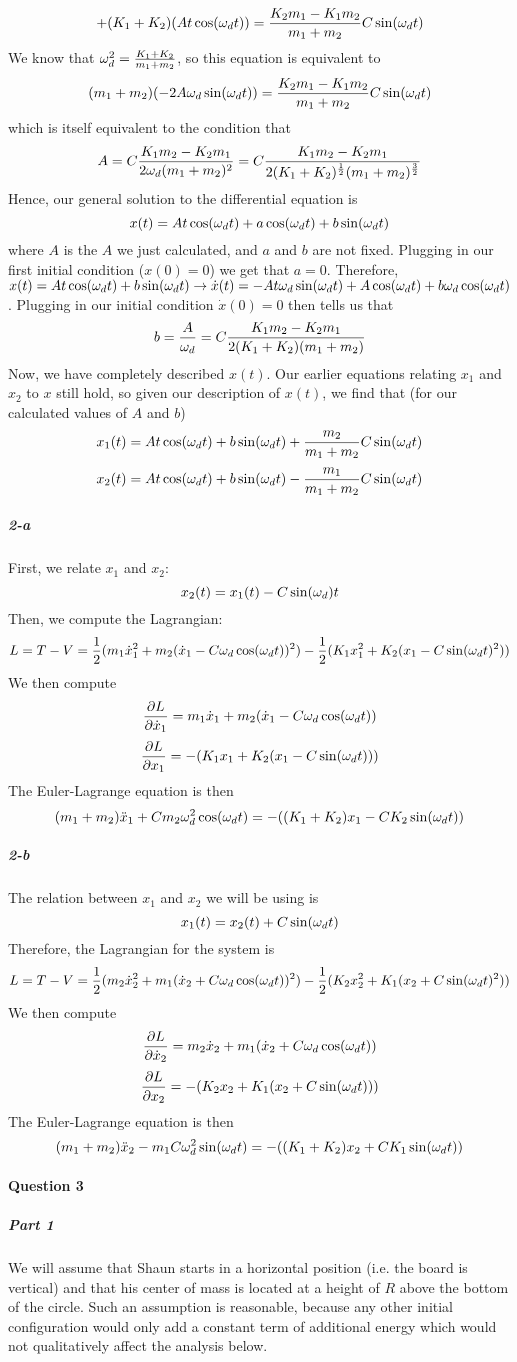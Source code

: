 $$+(K_1+K_2)( A t \cos(\omega_d t))=\frac{K_2 m_1-K_1 m_2}{m_1+m_2} C \sin(\omega_d t)$$
We know that $\omega_d^2 = \frac{K_1+K_2}{m_1+m_2}$, so this equation is equivalent to
$$(m_1+m_2)(-2A\omega_d \sin(\omega_d t))=\frac{K_2 m_1-K_1 m_2}{m_1+m_2} C \sin(\omega_d t)$$
which is itself equivalent to the condition that
$$A=C\frac{K_1 m_2-K_2 m_1}{2\omega_d(m_1+m_2)^2}=C\frac{K_1 m_2-K_2 m_1}{2(K_1+K_2)^{\frac 1 2}(m_1+m_2)^{\frac 3 2}}$$
Hence, our general solution to the differential equation is
$$x(t)=A t\cos(\omega_d t)+a \cos(\omega_d t)+b\sin(\omega_d t)$$
where $A$ is the $A$ we just calculated, and $a$ and $b$ are not fixed.  Plugging in our first initial condition ($x(0)=0$) we get that $a=0$.  Therefore, $x(t)=At\cos(\omega_d t)+b\sin(\omega_d t)\rightarrow \dot x(t)=-At \omega_d \sin(\omega_d t)+ A\cos(\omega_d t)+b\omega_d\cos(\omega_d t)$.  Plugging in our initial condition $\dot x(0)=0$ then tells us that
$$b=\frac{A}{\omega_d}=C\frac{K_1 m_2-K_2 m_1}{2(K_1+K_2)(m_1+m_2)}$$
Now, we have completely described $x(t)$.  Our earlier equations relating $x_1$ and $x_2$ to $x$ still hold, so given our description of $x(t)$, we find that (for our calculated values of $A$ and $b$)
$$x_1(t)=At \cos(\omega_d t)+b\sin(\omega_d t)+\frac{m_2}{m_1+m_2} C\sin(\omega_d t)$$
$$x_2(t)=At\cos(\omega_d t)+b\sin(\omega_d t)-\frac{m_1}{m_1+m_2}C\sin(\omega_d t)$$
\subparagraph{2-a}  First, we relate $x_1$ and $x_2$:
$$x_2(t)= x_1(t)-C\sin(\omega_d) t$$
Then, we compute the Lagrangian:
$$L=T-V= \frac 1 2 (m_1 \dot x_1^2 + m_2 (\dot x_1 - C\omega_d \cos(\omega_d t))^2)-\frac 1 2 (K_1 x_1^2+K_2 (x_1-C \sin(\omega_d t)^2))$$
We then compute
$$\frac{\partial L}{\partial \dot x_1}= m_1 \dot x_1 + m_2 (\dot x_1 - C \omega_d \cos(\omega_d t))$$
$$\frac{\partial L}{\partial x_1}=-(K_1 x_1+K_2(x_1-C\sin (\omega_d t)))$$
The Euler-Lagrange equation is then 
$$  (m_1+m_2)\ddot x_1 + C m_2 \omega_d^2 \cos(\omega_d t)=-((K_1+K_2) x_1 - C K_2 \sin(\omega_d t))$$
\subparagraph{2-b}  The relation between $x_1$ and $x_2$ we will be using is
$$x_1(t)=x_2(t) + C\sin(\omega_d t)$$
Therefore, the Lagrangian for the system is 
$$L=T-V= \frac 1 2 (m_2 \dot x_2^2 + m_1 (\dot x_2 + C\omega_d \cos(\omega_d t))^2)-\frac 1 2 (K_2 x_2^2+K_1 (x_2+C \sin(\omega_d t)^2))$$
We then compute
$$\frac{\partial L}{\partial \dot x_2}= m_2 \dot x_2 + m_1 (\dot x_2+ C \omega_d \cos(\omega_d t))$$
$$\frac{\partial L}{\partial x_2}=-(K_2 x_2+K_1(x_2+C\sin (\omega_d t)))$$
The Euler-Lagrange equation is then
$$ (m_1+m_2) \ddot x_2-m_1 C \omega_d^2 \sin(\omega_d t)=-((K_1+K_2) x_2+C K_1 \sin(\omega_d t))$$

\paragraph{Question 3}
\subparagraph{Part 1}
We will assume that Shaun starts in a horizontal position (i.e. the board is vertical) and that his center of mass is located at a height of $R$ above the bottom of the circle. Such an assumption is reasonable, because any other initial configuration would only add a constant term of additional energy which would not qualitatively affect the analysis below.

